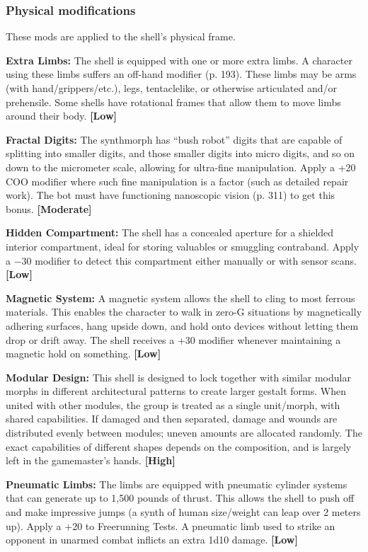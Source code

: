\subsubsection{Physical modifications} 

These mods are applied to the shell’s physical frame. 

\textbf{Extra Limbs:} The shell is equipped with one or more extra limbs. A character using these limbs suffers an off-hand modifier (p. 193). These limbs may be arms (with hand/grippers/etc.), legs, tentaclelike, or otherwise articulated and/or prehensile. Some shells have rotational frames that allow them to move limbs around their body. \textbf{[Low]} 

\textbf{Fractal Digits:} The synthmorph has ``bush robot'' digits that are capable of splitting into smaller digits, and those smaller digits into micro digits, and so on down to the micrometer scale, allowing for ultra-fine manipulation. Apply a +20 COO modifier where such fine manipulation is a factor (such as detailed repair work). The bot must have functioning nanoscopic vision (p. 311) to get this bonus. \textbf{[Moderate]} 

\textbf{Hidden Compartment:} The shell has a concealed aperture for a shielded interior compartment, ideal for storing valuables or smuggling contraband. Apply a $-$30 modifier to detect this compartment either manually or with sensor scans. \textbf{[Low]} 

\textbf{Magnetic System:} A magnetic system allows the shell to cling to most ferrous materials. This enables the character to walk in zero-G situations by magnetically adhering surfaces, hang upside down, and hold onto devices without letting them drop or drift away. The shell receives a +30 modifier whenever maintaining a magnetic hold on something. \textbf{[Low]} 

\textbf{Modular Design:} This shell is designed to lock together with similar modular morphs in different architectural patterns to create larger gestalt forms. When united with other modules, the group is treated as a single unit/morph, with shared capabilities. If damaged and then separated, damage and wounds are distributed evenly between modules; uneven amounts are allocated randomly. The exact capabilities of different shapes depends on the composition, and is largely left in the gamemaster’s hands. \textbf{[High]} 

\textbf{Pneumatic Limbs:} The limbs are equipped with pneumatic cylinder systems that can generate up to 1,500 pounds of thrust. This allows the shell to push off and make impressive jumps (a synth of human size/weight can leap over 2 meters up). Apply a +20 to Freerunning Tests. A pneumatic limb used to strike an opponent in unarmed combat inflicts an extra 1d10 damage. \textbf{[Low]} 

